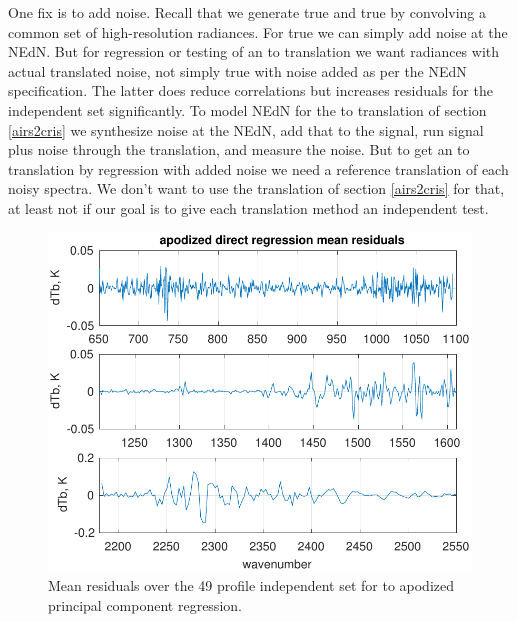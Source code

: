 \documentclass[10pt,twocolumn]{article}
\begin{document}
One fix is to add noise.  Recall that we generate true {\airs} 
and true {\cris} by convolving a common set of high-resolution
radiances.  For true {\airs} we can simply add noise at the {\airs}
NEdN.  But for regression or testing of an {\airs} to {\cris}
translation we want {\cris} radiances with actual translated {\airs}
noise, not simply true {\cris} with noise added as per the {\cris}
NEdN specification.  The latter does reduce correlations but
increases residuals for the independent set significantly.
To model NEdN for the {\airs} to {\cris} translation of section
\ref{airs2cris} we synthesize noise at the {\airs} NEdN, add that 
to the signal, run signal plus noise through the translation, and
measure the noise.  But to get an {\airs} to {\cris} translation by
regression with added noise we need a reference translation of each
noisy {\airs} spectra.  We don't want to use the translation of
section \ref{airs2cris} for that, at least not if our goal is to
give each translation method an independent test.

\begin{figure} %
  \centering
  \includegraphics[width=\linewidth]{figures/ap_pc_regr.pdf}
  \caption{Mean residuals over the 49 profile independent set for
    {\airs} to apodized {\cris} principal component regression.}
  \label{dreg6}
\end{figure}
\end{document}
